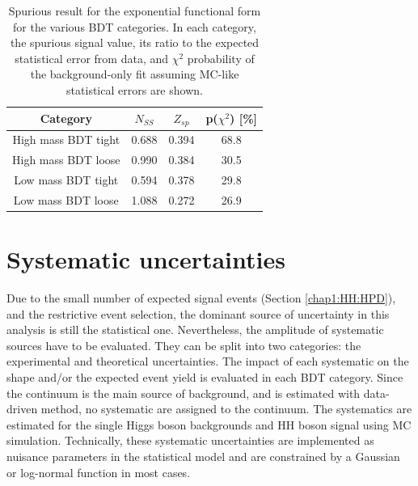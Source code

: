 \begin{table}[]
    \centering
    \begin{tabular}{cccc}
    \hline\hline
       Category  & $N_{SS}$ & $Z_{sp}$ & p($\chi^2$) [\%] \\
       \hline
       High mass BDT tight &  0.688 & 0.394 & 68.8 \\
       High mass BDT loose &  0.990 & 0.384 & 30.5 \\
       Low mass BDT tight  &  0.594 & 0.378 & 29.8 \\
       Low mass BDT loose  & 1.088  & 0.272 & 26.9 \\
       \hline\hline
    \end{tabular}
    \caption{Spurious result for the exponential functional form for the various BDT categories. In each category, the spurious signal value, its ratio to the expected statistical error from data, and $\chi^2$ probability of the background-only fit assuming MC-like statistical errors are shown.}
    \label{tab:HHyybb:Modelling:Bkg:SS}
\end{table}

\section{Systematic uncertainties}
\label{HHyybb:Syst}
Due to the small number of expected signal events (Section \ref{chap1:HH:HPD}), and the restrictive event selection, the dominant source of uncertainty in this analysis is still the statistical one. Nevertheless, the amplitude of systematic sources have to be evaluated. They can be split into two categories: the experimental and theoretical uncertainties. The impact of each systematic on the shape and/or the expected event yield is evaluated in each BDT category. Since the continuum is the main source of background, and is estimated with data-driven method, no systematic are assigned to the continuum. The systematics are estimated for the single Higgs boson backgrounds and HH boson signal using MC simulation. Technically, these systematic uncertainties are implemented as nuisance parameters in the statistical model and are constrained by a Gaussian or log-normal function in most cases. 
